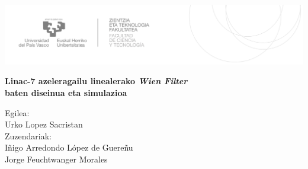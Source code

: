 \documentclass[12pt]{article}
\numberwithin{figure}{section}
\numberwithin{equation}{section}
\begin{document}

\begin{titlepage}
\hspace*{-3.5cm}
    \begin{minipage}{\textwidth}
        \vspace{-2.5cm}
        \begin{center}
    

            \includegraphics[width=\paperwidth]{LogoEHU.PNG}
        \end{center}
    \end{minipage}

\vspace{1cm}

\hspace{-3.5cm}
\noindent{}


\vspace{0.8cm}

\noindent\hspace*{-2.5cm}%
\colorbox{light-gray}{\begin{minipage}{\paperwidth}%

    \vspace{1cm}

    \color{RoyalBlue}
    \centering\Large\textbf{Linac-7 azeleragailu linealerako \textit{Wien Filter}\\ 
    baten diseinua eta simulazioa}
    \\


    \vspace{8cm}\mbox{}
  \end{minipage}
}
\vspace{0.8cm}

\begin{flushright}
 Egilea:
\\
Urko Lopez Sacristan
\\
Zuzendariak:
\\
Iñigo Arredondo López de Guereñu
\\
Jorge Feuchtwanger Morales                  
\\
\end{flushright}


\end{titlepage}
\end{document}
